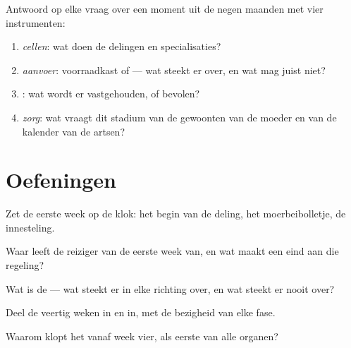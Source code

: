 \begin{method}\label{met:g8:from-egg-to-birth:explain}
Antwoord op elke vraag over een moment uit de negen maanden met vier
instrumenten:
\begin{enumerate}
  \item \emph{cellen}: wat doen de delingen en specialisaties?
  \item \emph{aanvoer}: voorraadkast of  --- wat steekt er over,
        en wat mag juist niet?
  \item \emph{}: wat wordt er vastgehouden, of bevolen?
  \item \emph{zorg}: wat vraagt dit stadium van de gewoonten van de moeder
        en van de kalender van de artsen?
\end{enumerate}
\end{method}

\section{Oefeningen}

\begin{exercise}[$\star$]\label{exo:g8:from-egg-to-birth:1}
Zet de eerste week op de klok: het begin van de deling, het
moerbeibolletje, de innesteling.
\end{exercise}

\begin{exercise}[$\star$]\label{exo:g8:from-egg-to-birth:2}
Waar leeft de reiziger van de eerste week van, en wat maakt een eind aan
die regeling?
\end{exercise}

\begin{exercise}[$\star$]\label{exo:g8:from-egg-to-birth:3}
Wat is de  --- wat steekt er in elke richting over, en wat steekt
er nooit over?
\end{exercise}

\begin{exercise}[$\star$]\label{exo:g8:from-egg-to-birth:4}
Deel de veertig weken in  en  in, met de bezigheid van elke
fase.
\end{exercise}

\begin{exercise}[$\star$]\label{exo:g8:from-egg-to-birth:5}
Waarom klopt het  vanaf week vier, als eerste van alle organen?
\end{exercise}

